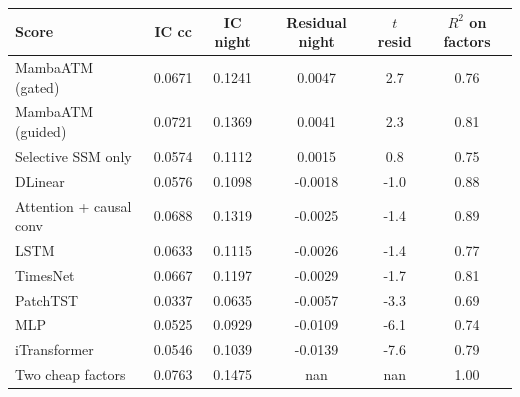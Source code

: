 {\scriptsize
\setlength{\tabcolsep}{2pt}
\begin{tabular}{lccccc}
\toprule
\textbf{Score} & \textbf{IC cc} & \textbf{IC night} & \textbf{Residual night} & \textbf{$t$ resid} & \textbf{$R^2$ on factors} \\
\midrule
MambaATM (gated) & 0.0671 & 0.1241 & 0.0047 & 2.7 & 0.76 \\
MambaATM (guided) & 0.0721 & 0.1369 & 0.0041 & 2.3 & 0.81 \\
Selective SSM only & 0.0574 & 0.1112 & 0.0015 & 0.8 & 0.75 \\
DLinear & 0.0576 & 0.1098 & -0.0018 & -1.0 & 0.88 \\
Attention + causal conv & 0.0688 & 0.1319 & -0.0025 & -1.4 & 0.89 \\
LSTM & 0.0633 & 0.1115 & -0.0026 & -1.4 & 0.77 \\
TimesNet & 0.0667 & 0.1197 & -0.0029 & -1.7 & 0.81 \\
PatchTST & 0.0337 & 0.0635 & -0.0057 & -3.3 & 0.69 \\
MLP & 0.0525 & 0.0929 & -0.0109 & -6.1 & 0.74 \\
iTransformer & 0.0546 & 0.1039 & -0.0139 & -7.6 & 0.79 \\
Two cheap factors & 0.0763 & 0.1475 & nan & nan & 1.00 \\
\bottomrule
\end{tabular}
}
